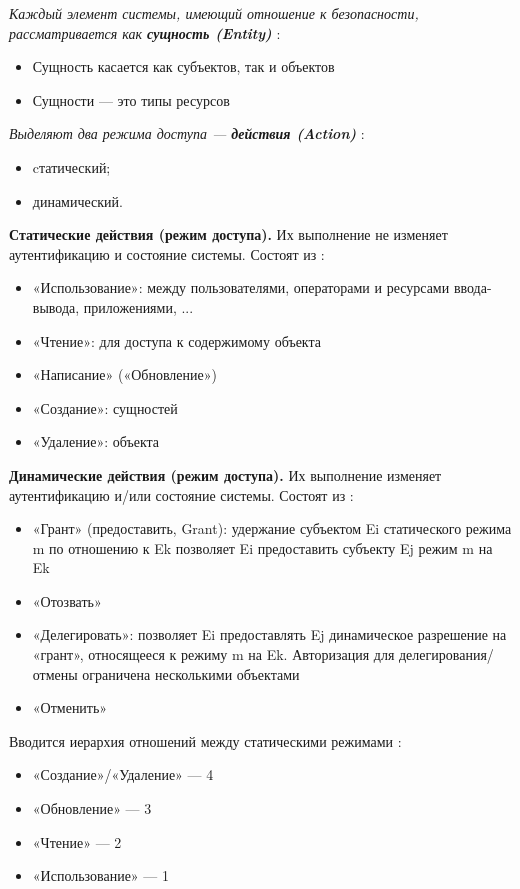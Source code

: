 \textit{Каждый элемент системы, имеющий отношение к безопасности, рассматривается как \textbf{сущность (Entity)}} \autocite{Jalili}:
\begin{itemize}
    \item Сущность касается как субъектов, так и объектов
    \item Сущности --- это типы ресурсов
\end{itemize}

\textit{Выделяют два режима доступа --- \textbf{действия (Action)}} \autocite{Jalili}:
\begin{itemize}
    \item cтатический;
    \item динамический.
\end{itemize}

\textbf{Статические действия (режим доступа).} Их выполнение не изменяет аутентификацию и состояние системы.
Состоят из \autocite{SecModels}:
\begin{itemize}
    \item «Использование»: между пользователями, операторами и ресурсами ввода-вывода, приложениями, ...
    \item «Чтение»: для доступа к содержимому объекта
    \item «Написание» («Обновление»)
    \item «Создание»: сущностей
    \item «Удаление»: объекта
\end{itemize}

\textbf{Динамические действия (режим доступа).} Их выполнение изменяет аутентификацию и/или состояние системы.
Состоят из \autocite{SecModels}:
\begin{itemize}
    \item «Грант» (предоставить, Grant): удержание субъектом Ei статического режима m по отношению к Ek
    позволяет Ei предоставить субъекту Ej режим m на Ek
    \item «Отозвать»
    \item «Делегировать»: позволяет Ei предоставлять Ej динамическое разрешение на «грант», относящееся к режиму m
    на Ek. Авторизация для делегирования/отмены ограничена несколькими объектами
    \item «Отменить»
\end{itemize}

Вводится иерархия отношений между статическими режимами \autocite{Jalili}:
\begin{itemize}
    \item «Создание»/«Удаление» --- 4
    \item «Обновление» --- 3
    \item «Чтение» --- 2
    \item «Использование» --- 1
\end{itemize}

